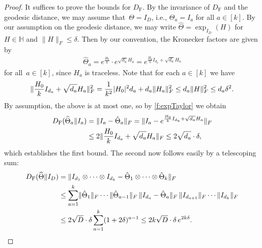 \documentclass[aos]{imsart}
\theoremstyle{definition}
\numberwithin{equation}{section}
\DeclarePairedDelimiter{\abs}{\lvert}{\rvert}
\DeclarePairedDelimiter{\norm}{\lVert}{\rVert}
\renewcommand{\H}{{\mathbb{H}}}
\newcommand{\htheta}{\widehat{\Theta}}
\newcommand{\ot}{\otimes}
\newcommand{\DF}{D_{\operatorname{F}}}
\begin{document}
\begin{proof}
It suffices to prove the bounds for $\DF$.
By the invariance of $\DF$ and the geodesic distance, we may assume that~$\Theta = I_D$, i.e., $\Theta_a = I_a$ for all $a\in[k]$.
By our assumption on the geodesic distance, we may write $\htheta = \exp_{I_D}(H) $ for $H \in \H$ and $\|H\|_F \leq \delta$.
Then by our convention, the Kronecker factors are given by
\begin{align*}
  \htheta_a
= e^{\frac{H_0}{k}} \cdot e^{\sqrt{d_a} H_a}
= e^{\frac{H_0}{k} I_{d_a} + \sqrt{d_a} H_a}
\end{align*}
for all~$a\in[k]$, since $H_a$ is traceless.
Note that for each $a \in [k]$ we have
\begin{align*}
  \norm{\frac{H_0}{k} I_{d_a} + \sqrt{d_a} H_a}_F^2
= \frac{1}{k^2} \abs{H_0}^2 d_a + d_a \norm{H_a}_F^2
\leq d_a \norm{H}_F^2
\leq d_a \delta^2.
\end{align*}
By assumption, the above is at most one, so by \cref{f:expTaylor} we obtain
\begin{align*}
  \DF(\htheta_a \Vert I_a)
&= \norm{I_a - \hat\Theta_a}_F
= \norm{I_a - e^{\frac{H_0}{k} I_{d_a} + \sqrt{d_a} H_a}}_F \\
&\leq 2 \norm{\frac{H_0}{k} I_{d_a} + \sqrt{d_a} H_a}_F
\leq 2 \sqrt{d_a} \cdot \delta,
\end{align*}
which establishes the first bound.
The second now follows easily by a telescoping sum:
\begin{align*}
  \DF(\htheta\Vert I_D)
&= \norm{I_{d_1} \ot \cdots \ot I_{d_k} - \hat\Theta_1 \ot \cdots \ot \hat\Theta_k}_F \\
&\leq \sum_{a=1}^k \norm{\hat\Theta_1}_F \cdots \norm{\hat\Theta_{a-1}}_F \, \norm{I_{d_a} - \hat\Theta_a}_F \, \norm{I_{d_{a+1}}}_F \cdots \norm{I_{d_k}}_F \\
&\leq 2 \sqrt{D} \cdot \delta \sum_{a=1}^k (1 + 2 \delta)^{a-1}
\leq 2 k \sqrt{D} \cdot \delta \, e^{2k\delta}.
\end{align*}
\end{proof}
\end{document}
